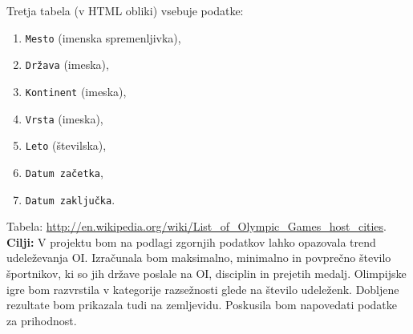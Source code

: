 \documentclass[11pt,a4paper]{article}
\begin{document}
Tretja tabela (v HTML obliki) vsebuje podatke: 
\begin{enumerate}
\item{\verb|Mesto| (imenska spremenljivka),}
\item{\verb|Država| (imeska),}
\item{\verb|Kontinent| (imeska),}
\item{\verb|Vrsta| (imeska),}
\item{\verb|Leto| (številska),}
\item{\verb|Datum začetka|,}
\item{\verb|Datum zaključka|.}

\end{enumerate}
 Tabela:
\url{http://en.wikipedia.org/wiki/List_of_Olympic_Games_host_cities}.
\newline
\textbf{Cilji:} V projektu bom na podlagi zgornjih podatkov lahko opazovala trend udeleževanja OI. 
Izračunala bom maksimalno, minimalno in povprečno število športnikov, ki so jih države poslale na OI, disciplin in prejetih medalj. 
Olimpijske igre bom razvrstila v kategorije razsežnosti glede na število udeleženk. Dobljene rezultate bom prikazala tudi 
na zemljevidu. Poskusila bom napovedati podatke za prihodnost.

\newpage
\end{document}
